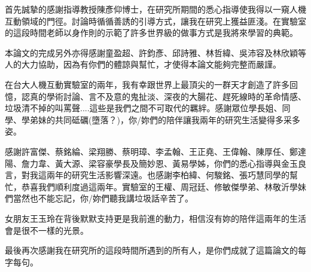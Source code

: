 \begin{acknowledgementszh}
首先誠摯的感謝指導教授陳彥仰博士，在研究所期間的悉心指導使我得以一窺人機互動領域的門徑。討論時循循善誘的引導方式，讓我在研究上獲益匪淺。在實驗室的這段時間老師以身作則的示範了許多世界級的做事方式是我將來學習的典範。

本論文的完成另外亦得感謝童盈超、許鈞彥、邱詩雅、林哲緯、吳沛容及林欣穎等人的大力協助，因為有你們的體諒與幫忙，才使得本論文能夠完整而嚴謹。

在台大人機互動實驗室的兩年，我有幸跟世界上最頂尖的一群天才創造了許多回憶，認真的學術討論、言不及意的鬼扯淡、深夜的大腸花、趕死線時的革命情感、垃圾清不掉的叫罵聲....這些是我們之間不可取代的羈絆。感謝眾位學長姐、同學、學弟妹的共同砥礪(墮落？)，你/妳們的陪伴讓我兩年的研究生活變得多采多姿。

感謝許富傑、蔡銘綸、梁翔勝、蔡明璋、李孟翰、王正堯、王偉翰、陳厚任、鄭達陽、詹力韋、黃大源、梁容豪學長及簡妙恩、黃易學姊，你們的悉心指導與金玉良言，對我這兩年的研究生活影響深遠。也感謝李柏緯、何駿銘、張巧慧同學的幫忙，恭喜我們順利度過這兩年。實驗室的王權、周冠廷、修敏傑學弟、林敬沂學妹們當然也不能忘記，你/妳們聽我講垃圾話辛苦了。


女朋友王玉玲在背後默默支持更是我前進的動力，相信沒有妳的陪伴這兩年的生活會是很不一樣的光景。

最後再次感謝我在研究所的這段時間所遇到的所有人，是你們成就了這篇論文的每字每句。


\end{acknowledgementszh}

